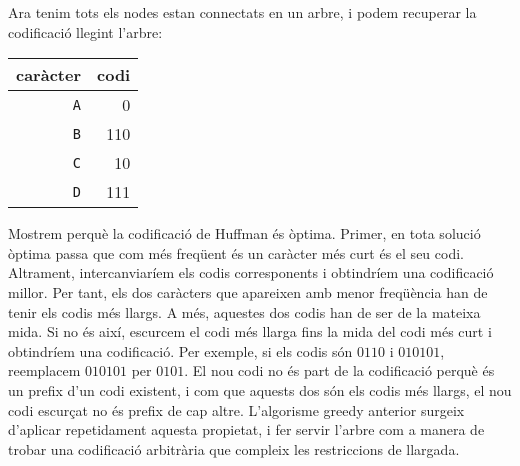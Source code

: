 Ara tenim tots els nodes estan connectats en un arbre, i
podem recuperar la codificació llegint l'arbre:
\begin{center}
\begin{tabular}{rr}
caràcter & codi \\
\hline
\texttt{A} & 0 \\
\texttt{B} & 110 \\
\texttt{C} & 10 \\
\texttt{D} & 111 \\
\end{tabular}
\end{center}

Mostrem perquè la codificació de Huffman és òptima.  Primer, en tota
solució òptima passa que com més freqüent és un caràcter més curt és
el seu codi. Altrament, intercanviaríem els codis corresponents i
obtindríem una codificació millor.  Per tant, els dos caràcters que
apareixen amb menor freqüència han de tenir els codis més llargs. A
més, aquestes dos codis han de ser de la mateixa mida. Si no
és així, escurcem el codi més llarga fins la mida del codi més curt i
obtindríem una codificació. Per exemple, si els codis són
$0110$ i $010101$, reemplacem $010101$ per $0101$. El nou codi no
és part de la codificació perquè és un prefix d'un codi existent, i
com que aquests dos són els codis més llargs, el nou codi escurçat no
és prefix de cap altre. L'algorisme greedy anterior surgeix d'aplicar
repetidament aquesta propietat, i fer servir l'arbre com a manera de
trobar una codificació arbitrària que compleix les restriccions de
llargada.
